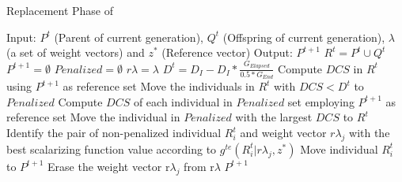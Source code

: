 \begin{algorithm}[t]
        \caption{Replacement Phase of \AVSDMOEAD{}}
\begin{small}
\begin{algorithmic}[1]
\STATE Input: $P^t$ (Parent of current generation), $Q^t$ (Offspring of current generation), $\lambda$ (a set of weight vectors) and $z^*$ (Reference vector)
        \STATE Output: $P^{t+1}$
        \STATE $R^t = P^t \cup Q^t$\label{alg_2:1} 
        \STATE $P^{t+1} = \emptyset$ \label{alg_2:2}
        \STATE $Penalized = \emptyset$ \label{alg_2:3}
				\STATE $r\lambda = \lambda$
        \STATE $D^t = D_I - D_I * \frac{G_{Elapsed}}{0.5*G_{End}}$ \label{alg_2:5} 
         \label{alg_2:6}
            \STATE Compute $DCS$ in $R^t$ using $P^{t+1}$ as reference set \label{alg_2:7}
            \STATE Move the individuals in $R^t$ with $DCS < D^t$ to $Penalized$ \label{alg_2:8}
                 \label{alg_2:9}
                    \STATE Compute $DCS$ of each individual in $Penalized$ set employing $P^{t+1}$ as reference set \label{alg_2:10}
                    \STATE Move the individual in $Penalized$ with the largest $DCS$ to $R^t$ \label{alg_2:11}
                \ENDIF \label{alg_2:12}
            \STATE Identify the pair of non-penalized individual $R_i^t$ and weight vector $r\lambda_j$ with the best scalarizing function value according to $g^{te}(R_i^t | r\lambda_j, z^*)$ \label{alg_2:13}
	    \STATE Move individual $R_i^t$ to $P^{t+1}$ \label{alg_2:14}
            \STATE Erase the weight vector r$\lambda_j$ from r$\lambda$ \label{alg_2:15}
        \ENDWHILE \label{alg_2:16}
        \RETURN $P^{t+1}$ \label{alg_2:17}
        \end{algorithmic}
\end{small}
\label{alg:replacement}
\end{algorithm}

